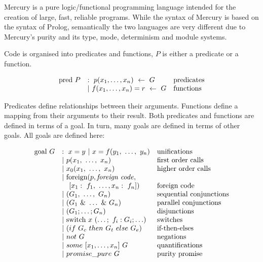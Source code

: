 
Mercury is a pure logic/functional programming language
intended for the creation of large, fast, reliable programs.
While the syntax of Mercury is based on the syntax of Prolog,
semantically the two languages are very different
due to Mercury's purity and its type, mode, determinism and module systems.

Code is organised into predicates and functions,
$P$ is either a predicate or a function.

$$
\begin{array}{lll}
\mbox{pred}~P
    & :~ p(x_1, \ldots, x_n)~\leftarrow~G
        & \hbox{predicates} \\
    & |~ f(x_1, \ldots, x_n)=r~\leftarrow~G
        & \hbox{functions} \\
\end{array}
$$

\noindent
Predicates define relationships between their arguments.
Functions define a mapping from their arguments to their result.
Both predicates and functions are defined in terms of a goal.
In turn, many goals are defined in terms of other goals.
All goals are defined here:

$$
\begin{array}{lll}
\mbox{goal}~G
    & :~ x = y ~|~ x = f(y_1,~\ldots,~y_n)
        & \hbox{unifications}\\
    & |~ p(x_1,~\ldots,~x_n)
        & \hbox{first order calls} \\
    & |~ x_0(x_1,~\ldots,~x_n)
        & \hbox{higher order calls} \\
    & |~ \hbox{foreign}(p, \hbox{\emph{foreign code}},
        & \\
    & ~~~ [x_1:~f_1,~\ldots,x_n:~f_n])
        & \hbox{foreign code} \\
    & |~ (G_1,~\ldots,~G_n)
        & \hbox{sequential conjunctions}\\
    & |~ (G_1~\&~\ldots~\&~G_n)
        & \hbox{parallel conjunctions}\\
    & |~ (G_1 ; \ldots ; G_n)
        & \hbox{disjunctions}\\
    & |~ \hbox{switch}~x~(\ldots;~f_i: G_i ; \ldots)
        & \hbox{switches}\\
    & |~ (if~G_c~then~G_t~else~G_e)
        & \hbox{if-then-elses}\\
    & |~ not~G
        & \hbox{negations}\\
    & |~ some~[x_1,\ldots,x_n]~G
        & \hbox{quantifications}\\
    & |~ promise\_pure~G
        & \hbox{purity promise}\\
\end{array}
$$

